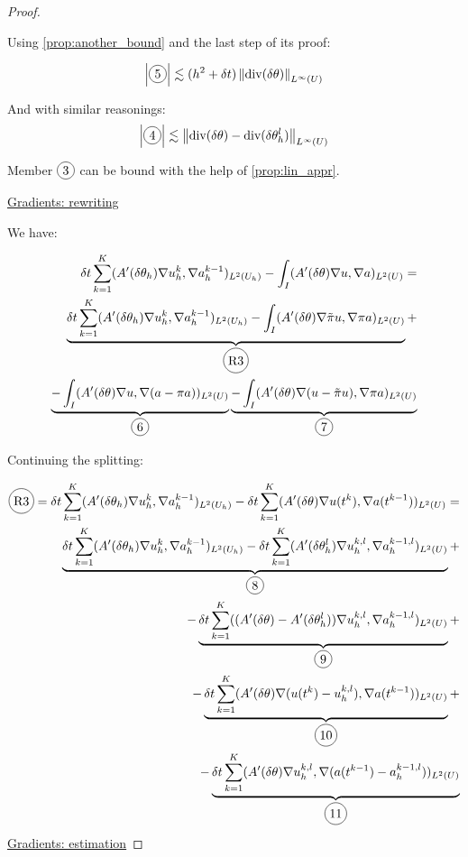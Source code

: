 \documentclass[english,a4paper,9pt,oneside]{scrbook}	%
\theoremstyle{break}
\newenvironment{mproof}[1][\proofname]{%
  \begin{proof}[#1]$ $\par\nobreak\ignorespaces
}{%
  \end{proof}
}
\renewcommand*{\proofname}{Proof}
\theoremstyle{remark}
\newcommand{\norm}[1]{\left\lVert#1\right\rVert}
\newcommand{\te}{\theta}
\newcommand{\dive}{\text{div}}
\newcommand*\circled[1]{\tikz[baseline=(char.base)]{
            \node[shape=circle,draw,inner sep=2pt] (char) {#1};}}
\begin{document}
\begin{mproof}
Using \cref{prop:another_bound} and the last step of its proof:

\begin{align*}
	\left |\circled{5}\right|\lesssim (h^2+\delta t)  \norm{\dive(\delta \te)}_{L^\infty(U)}
\end{align*}

And with similar reasonings:
\begin{align*}
	\left |\circled{4}\right|\lesssim \norm{\dive(\delta \te) - \dive(\delta \te_h^l)}_{L^\infty(U)}
\end{align*}

Member $\circled{3}$ can be bound with the help of \cref{prop:lin_appr}.

\underline{Gradients: rewriting}

We have:

\begin{align*}
	\delta t \sum_{k=1}^{K} (A'(\delta \theta_h ) \nabla u_h^k, \nabla a_h^{k-1})_{L^2(U_h)} - \int_I (A'(\delta\te )\nabla u, \nabla a)_{L^2(U)} = \\
	\underbrace{\delta t \sum_{k=1}^{K} (A'(\delta \theta_h ) \nabla u_h^k, \nabla a_h^{k-1})_{L^2(U_h)}- \int_I (A'(\delta\te )\nabla\tilde{\pi}u, \nabla \pi a)_{L^2(U)}}_{\circled{R3}} + \\\underbrace{- \int_I (A'(\delta\te )\nabla u, \nabla (a-\pi a))_{L^2(U)}}_{\circled{6}}\underbrace{- \int_I (A'(\delta\te )\nabla (u - \tilde{\pi}u), \nabla \pi a)_{L^2(U)}}_{\circled{7}} 
\end{align*}

Continuing the splitting:

\begin{align*}
\circled{R3} = \delta t \sum_{k=1}^{K} (A'(\delta \theta_h ) \nabla u_h^k, \nabla a_h^{k-1})_{L^2(U_h)} - \delta t \sum_{k=1}^{K} (A'(\delta\te )\nabla u(t^{k}) , \nabla a(t^{k-1}))_{L^2(U)} = \\
\underbrace{\delta t \sum_{k=1}^{K} (A'(\delta \theta_h ) \nabla u_h^k, \nabla a_h^{k-1})_{L^2(U_h)} - \delta t \sum_{k=1}^{K} (A'(\delta\te_h^l )\nabla u_h^{k,l} , \nabla a_h^{k-1,l})_{L^2(U)}}_{\circled{8}}+\\
- \underbrace{\delta t \sum_{k=1}^{K} ((A'(\delta \te) - A'(\delta\te_h^l ))\nabla u_h^{k,l} , \nabla a_h^{k-1,l})_{L^2(U)}}_{\circled{9}}+\\
- \underbrace{\delta t \sum_{k=1}^{K} (A'(\delta\te )\nabla (u(t^{k})-u_h^{k,l}) , \nabla a(t^{k-1}))_{L^2(U)}}_{\circled{10}}+\\
- \underbrace{\delta t \sum_{k=1}^{K} (A'(\delta\te )\nabla u_h^{k,l} , \nabla (a(t^{k-1}) -a_h^{k-1,l}))_{L^2(U)}}_{\circled{11}}
\end{align*}
\underline{Gradients: estimation}


\end{mproof}
\end{document}
